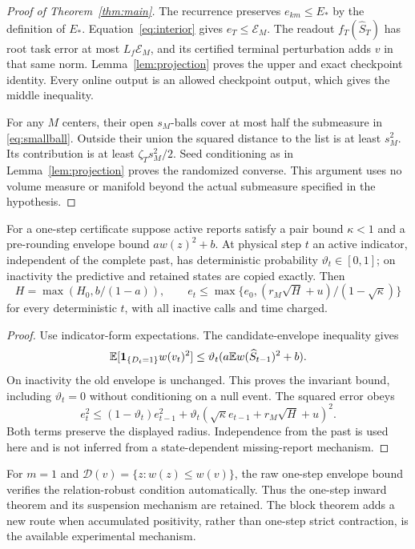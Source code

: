 \begin{proof}[Proof of Theorem~\ref{thm:main}]
The recurrence preserves $e_{km}\le E_*$ by the definition of $E_*$. Equation~\eqref{eq:interior} gives $e_T\le\mathcal E_M$. The readout $f_T(\widehat S_T)$ has root task error at most $L_f\mathcal E_M$, and its certified terminal perturbation adds $v$ in that same norm. Lemma~\ref{lem:projection} proves the upper and exact checkpoint identity. Every online output is an allowed checkpoint output, which gives the middle inequality.

For any $M$ centers, their open $s_M$-balls cover at most half the submeasure in \eqref{eq:smallball}. Outside their union the squared distance to the list is at least $s_M^2$. Its contribution is at least $\zeta_Ts_M^2/2$. Seed conditioning as in Lemma~\ref{lem:projection} proves the randomized converse. This argument uses no volume measure or manifold beyond the actual submeasure specified in the hypothesis.
\end{proof}

\begin{corollary}\label{cor:holds}
For a one-step certificate suppose active reports satisfy a pair bound $\kappa<1$ and a pre-rounding envelope bound $aw(z)^2+b$. At physical step $t$ an active indicator, independent of the complete past, has deterministic probability $\vartheta_t\in[0,1]$; on inactivity the predictive and retained states are copied exactly. Then
\[
 H=\max(H_0,b/(1-a)),\qquad
 e_t\le\max\{e_0,(r_M\sqrt H+u)/(1-\sqrt\kappa)\}
\]
for every deterministic $t$, with all inactive calls and time charged.
\end{corollary}
\begin{proof}
Use indicator-form expectations. The candidate-envelope inequality gives
\[
\mathbb E[\mathbf 1_{\{D_t=1\}}w(v_t)^2]
\le\vartheta_t(a\mathbb E w(\widehat S_{t-1})^2+b).
\]
On inactivity the old envelope is unchanged. This proves the invariant bound, including $\vartheta_t=0$ without conditioning on a null event. The squared error obeys
\[
 e_t^2\le(1-\vartheta_t)e_{t-1}^2+
 \vartheta_t(\sqrt\kappa e_{t-1}+r_M\sqrt H+u)^2.
\]
Both terms preserve the displayed radius. Independence from the past is used here and is not inferred from a state-dependent missing-report mechanism.
\end{proof}

For $m=1$ and $\mathcal D(v)=\{z:w(z)\le w(v)\}$, the raw one-step envelope bound verifies the relation-robust condition automatically. Thus the one-step inward theorem and its suspension mechanism are retained. The block theorem adds a new route when accumulated positivity, rather than one-step strict contraction, is the available experimental mechanism.
